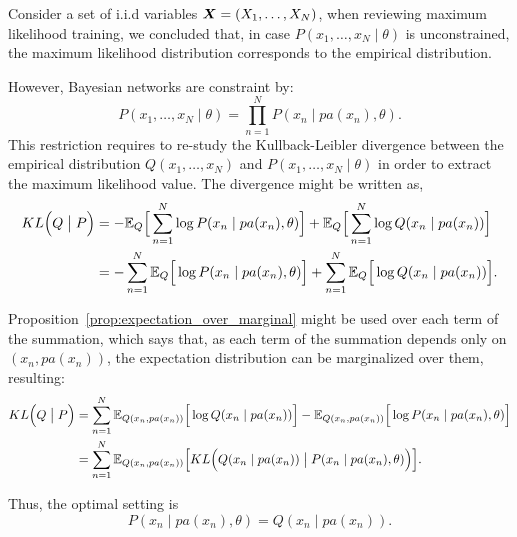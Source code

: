 
Consider a set of i.i.d variables \(\bm{X} = (X_{1},\dots,X_{N})\), when reviewing maximum likelihood training, we concluded that, in case \(P(x_{1},\dots, x_{N} \mid \theta)\) is unconstrained, the maximum likelihood distribution corresponds to the empirical distribution.

However, Bayesian networks are constraint by:
 \[
   P(x_{1}, \dots, x_{N} \mid \theta) = \prod_{n = 1}^N P(x_n  \mid  pa(x_n), \theta).
 \]
This restriction requires to re-study the Kullback-Leibler divergence between the empirical
 distribution \(Q(x_1,\dots,x_N)\) and \(P(x_1, \dots, x_N \mid \theta)\) in order to extract the maximum likelihood value. The divergence might be written as,
 \[
   \begin{aligned}
   KL\Big(Q \bigm| P\Big) &= - \mathbb{E}_{Q}\Big[\sum_{n = 1}^N\log{P(x_n \mid pa(x_n), \theta)}\Big] +
   \mathbb{E}_{Q}\Big[\sum_{n = 1}^N\log{Q(x_n \mid pa(x_n))}\Big]
   \\ &= - \sum_{n = 1}^N \mathbb{E}_{Q}\Big[\log{P(x_n \mid pa(x_n), \theta)}\Big] + \sum_{n =
     1}^N \mathbb{E}_{Q}\Big[\log{Q(x_n \mid pa(x_n))}\Big].
   \end{aligned}
 \]

Proposition~\ref{prop:expectation_over_marginal} might be used over each term of the summation, which says that, as each term of the summation depends only on \((x_{n}, pa(x_{n}))\), the expectation distribution can be marginalized over them, resulting:
 \[
   \begin{aligned}
     KL\Big(Q \bigm| P\Big) &= \sum_{n = 1}^N \mathbb{E}_{Q(x_n,pa(x_n))}\Big[\log{Q(x_n \mid pa(x_n))}\Big] - \mathbb{E}_{Q(x_n,pa(x_n))}\Big[\log{P(x_n \mid pa(x_n), \theta)}\Big]\\
     &= \sum_{n = 1}^N \mathbb{E}_{Q(x_n,pa(x_n))}\Big[KL\Big(Q(x_n \mid pa(x_n)) \bigm| P(x_n \mid pa(x_n), \theta)\Big)\Big].
   \end{aligned}
 \]

 Thus, the optimal setting is
 \[
   P(x_n \mid pa(x_n), \theta) = Q(x_n \mid pa(x_n)).
 \]
